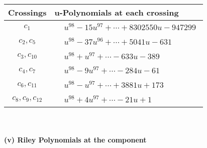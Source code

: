 \documentclass[1p]{elsarticle_modified}
\theoremstyle{definition}
\begin{document}
\begin{tabular}{m{50pt}|m{274pt}}
Crossings & \hspace{64pt}u-Polynomials at each crossing \\
\hline $$\begin{aligned}c_{1}\end{aligned}$$&$\begin{aligned}
&u^{98}-15 u^{97}+\cdots+8302550 u-947299
\end{aligned}$\\
\hline $$\begin{aligned}c_{2},c_{5}\end{aligned}$$&$\begin{aligned}
&u^{98}-37 u^{96}+\cdots+5041 u-631
\end{aligned}$\\
\hline $$\begin{aligned}c_{3},c_{10}\end{aligned}$$&$\begin{aligned}
&u^{98}+u^{97}+\cdots-633 u-389
\end{aligned}$\\
\hline $$\begin{aligned}c_{4},c_{7}\end{aligned}$$&$\begin{aligned}
&u^{98}-9 u^{97}+\cdots-284 u-61
\end{aligned}$\\
\hline $$\begin{aligned}c_{6},c_{11}\end{aligned}$$&$\begin{aligned}
&u^{98}- u^{97}+\cdots+3881 u+173
\end{aligned}$\\
\hline $$\begin{aligned}c_{8},c_{9},c_{12}\end{aligned}$$&$\begin{aligned}
&u^{98}+4 u^{97}+\cdots-21 u+1
\end{aligned}$\\
\hline
\end{tabular}\\~\\
\newpage\renewcommand{\arraystretch}{1}
\flushleft \textbf{(v) Riley Polynomials at the component}\newline \\
\end{document}
